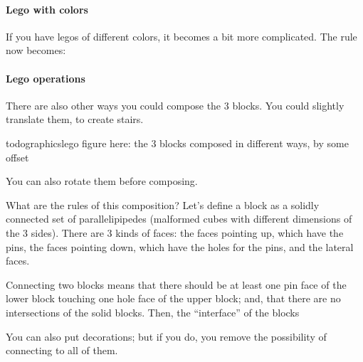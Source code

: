\paragraph{Lego with colors}

If you have legos of different colors, it becomes a bit more complicated. The rule now becomes:
\begin{center}
  {}
\end{center}

\paragraph{Lego operations}

There are also other ways you could compose the 3 blocks. You could slightly translate them, to create stairs.

todographics{lego figure here: the 3 blocks composed in different ways, by some offset}

You can also rotate them before composing.


What are the rules of this composition? Let's define a block as a solidly connected set of parallelipipedes (malformed cubes with different dimensions of the 3 sides). There are 3 kinds of faces: the faces pointing up, which have the pins, the faces pointing down, which have the holes for the pins, and the lateral faces.

Connecting two blocks means that there should be at least one pin face of the lower block touching one hole face of the upper block; and, that there are no intersections of the solid blocks. Then, the ``interface'' of the blocks


You can also put decorations; but if you do, you remove the possibility of connecting to all of them.

